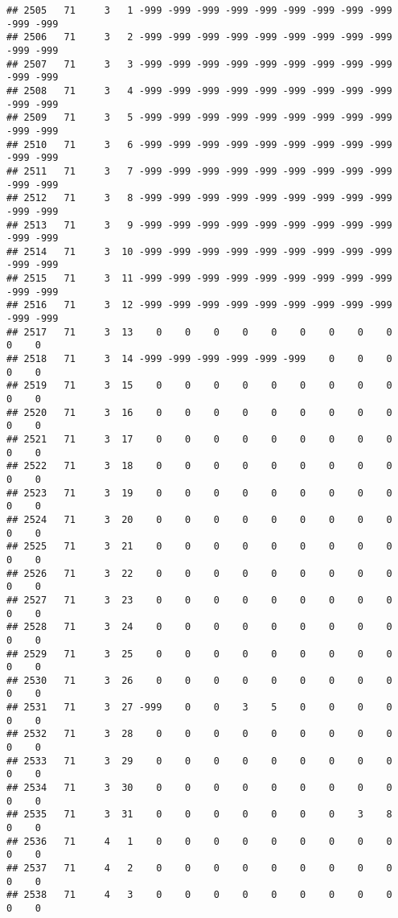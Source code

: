 \documentclass[]{article}
\begin{document}
\begin{verbatim}
## 2505   71     3   1 -999 -999 -999 -999 -999 -999 -999 -999 -999 -999 -999
## 2506   71     3   2 -999 -999 -999 -999 -999 -999 -999 -999 -999 -999 -999
## 2507   71     3   3 -999 -999 -999 -999 -999 -999 -999 -999 -999 -999 -999
## 2508   71     3   4 -999 -999 -999 -999 -999 -999 -999 -999 -999 -999 -999
## 2509   71     3   5 -999 -999 -999 -999 -999 -999 -999 -999 -999 -999 -999
## 2510   71     3   6 -999 -999 -999 -999 -999 -999 -999 -999 -999 -999 -999
## 2511   71     3   7 -999 -999 -999 -999 -999 -999 -999 -999 -999 -999 -999
## 2512   71     3   8 -999 -999 -999 -999 -999 -999 -999 -999 -999 -999 -999
## 2513   71     3   9 -999 -999 -999 -999 -999 -999 -999 -999 -999 -999 -999
## 2514   71     3  10 -999 -999 -999 -999 -999 -999 -999 -999 -999 -999 -999
## 2515   71     3  11 -999 -999 -999 -999 -999 -999 -999 -999 -999 -999 -999
## 2516   71     3  12 -999 -999 -999 -999 -999 -999 -999 -999 -999 -999 -999
## 2517   71     3  13    0    0    0    0    0    0    0    0    0    0    0
## 2518   71     3  14 -999 -999 -999 -999 -999 -999    0    0    0    0    0
## 2519   71     3  15    0    0    0    0    0    0    0    0    0    0    0
## 2520   71     3  16    0    0    0    0    0    0    0    0    0    0    0
## 2521   71     3  17    0    0    0    0    0    0    0    0    0    0    0
## 2522   71     3  18    0    0    0    0    0    0    0    0    0    0    0
## 2523   71     3  19    0    0    0    0    0    0    0    0    0    0    0
## 2524   71     3  20    0    0    0    0    0    0    0    0    0    0    0
## 2525   71     3  21    0    0    0    0    0    0    0    0    0    0    0
## 2526   71     3  22    0    0    0    0    0    0    0    0    0    0    0
## 2527   71     3  23    0    0    0    0    0    0    0    0    0    0    0
## 2528   71     3  24    0    0    0    0    0    0    0    0    0    0    0
## 2529   71     3  25    0    0    0    0    0    0    0    0    0    0    0
## 2530   71     3  26    0    0    0    0    0    0    0    0    0    0    0
## 2531   71     3  27 -999    0    0    3    5    0    0    0    0    0    0
## 2532   71     3  28    0    0    0    0    0    0    0    0    0    0    0
## 2533   71     3  29    0    0    0    0    0    0    0    0    0    0    0
## 2534   71     3  30    0    0    0    0    0    0    0    0    0    0    0
## 2535   71     3  31    0    0    0    0    0    0    0    3    8    0    0
## 2536   71     4   1    0    0    0    0    0    0    0    0    0    0    0
## 2537   71     4   2    0    0    0    0    0    0    0    0    0    0    0
## 2538   71     4   3    0    0    0    0    0    0    0    0    0    0    0

\end{verbatim}
\end{document}
